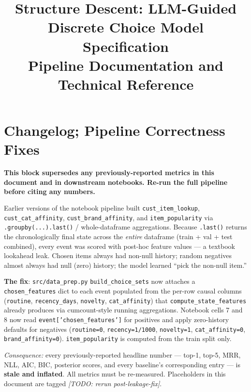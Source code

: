 \documentclass[11pt,a4paper]{article}
\title{Structure Descent: LLM-Guided Discrete Choice Model Specification\\[6pt]
\large Pipeline Documentation and Technical Reference}
\author{}
\date{}
\begin{document}
\maketitle
\tableofcontents
\newpage

\section{Changelog; Pipeline Correctness Fixes}
\label{sec:changelog}

\textbf{This block supersedes any previously-reported metrics in this document and in downstream notebooks.  Re-run the full pipeline before citing any numbers.}

\begin{description}[style=nextline]

\item[Feature-lookup lookahead leakage (data prep).]
Earlier versions of the notebook pipeline built \texttt{cust\_item\_lookup}, \texttt{cust\_cat\_affinity}, \texttt{cust\_brand\_affinity}, and \texttt{item\_popularity} via \texttt{.groupby(...).last()} / whole-dataframe aggregations.  Because \texttt{.last()} returns the chronologically final state across the \emph{entire} dataframe (train + val + test combined), every event was scored with post-hoc feature values --- a textbook lookahead leak.  Chosen items always had non-null history; random negatives almost always had null (zero) history; the model learned ``pick the non-null item.''

\textbf{The fix}: \texttt{src/data\_prep.py} \texttt{build\_choice\_sets} now attaches a \texttt{chosen\_features} dict to each event populated from the per-row causal columns (\texttt{routine}, \texttt{recency\_days}, \texttt{novelty}, \texttt{cat\_affinity}) that \texttt{compute\_state\_features} already produces via cumcount-style running aggregations.  Notebook cells 7 and 8 now read \texttt{event['chosen\_features']} for positives and apply zero-history defaults for negatives (\texttt{routine=0}, \texttt{recency=1/1000}, \texttt{novelty=1}, \texttt{cat\_affinity=0}, \texttt{brand\_affinity=0}).  \texttt{item\_popularity} is computed from the train split only.

\emph{Consequence:} every previously-reported headline number --- top-1, top-5, MRR, NLL, AIC, BIC, posterior scores, and every baseline's corresponding entry --- is \textbf{stale and inflated}.  All metrics must be re-measured.  Placeholders in this document are tagged \emph{[TODO: rerun post-leakage-fix]}.


\end{description}
\end{document}
